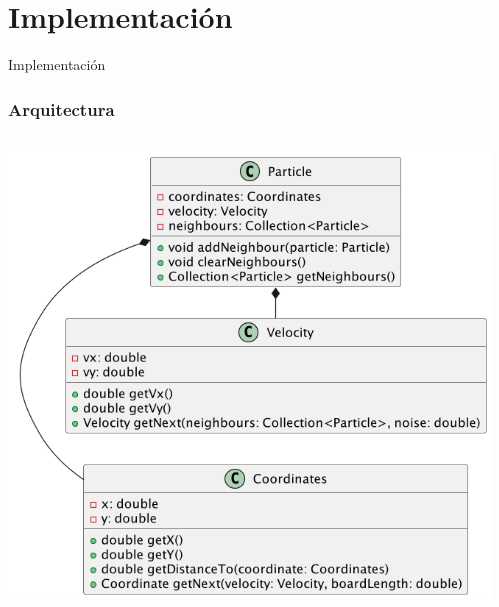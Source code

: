 \section{Implementación}

{
\begin{frame}
    \centering
  \Huge
  Implementación
\end{frame}
}

\begin{frame}
    \frametitle{Arquitectura}
    \begin{columns}[T] %
        \begin{column}{0.6\textwidth}
          \includegraphics[width=\textwidth]{images/particle-diagram.png} 
        \end{column}
        \begin{column}{0.4\textwidth}

\end{column}
\end{columns}
\end{frame}
